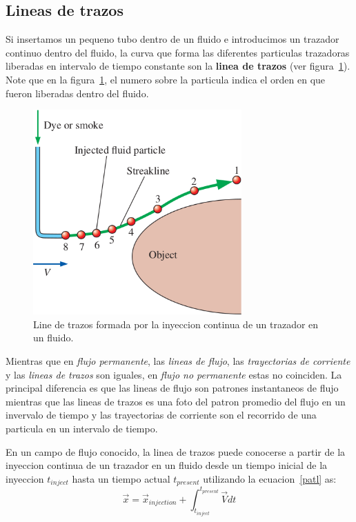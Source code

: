 \documentclass[10pt, oneside]{article}
\begin{document}
\subsection{Lineas de trazos}
Si insertamos un pequeno tubo dentro de un fluido e introducimos un  trazador continuo dentro del fluido, la curva que forma las diferentes particulas trazadoras liberadas en intervalo de tiempo constante son la \textbf{linea de trazos} (ver figura~\ref{litra}). Note que en la figura~\ref{litra}, el numero sobre la particula indica el orden en que fueron liberadas dentro del fluido. 
\begin{figure}[h]
\centering
\includegraphics[width=8cm]{litra}
\caption{Line de trazos formada por la inyeccion continua de un trazador en un fluido.}
\label{litra}
\end{figure}
Mientras que en \emph{flujo permanente}, las \emph{lineas de flujo}, las \emph{trayectorias de corriente} y las \emph{lineas de trazos} son iguales, en \emph{flujo no permanente} estas no coinciden. La principal diferencia es que las lineas de flujo son patrones instantaneos de flujo mientras que las lineas de trazos es una foto del patron promedio del flujo en un invervalo de tiempo y las trayectorias de corriente son el recorrido de una particula en un intervalo de tiempo. 


En un campo de flujo conocido, la linea de trazos puede conocerse a partir de la inyeccion continua de un trazador en un fluido desde un tiempo inicial de la inyeccion $t_{inject}$ hasta un tiempo actual $t_{present}$ utilizando la ecuacion~\ref{patl} as:
\begin{equation}
\vec{x} = \vec{x}_{injection} + \int_{t_{inject}}^{t_{present}} \vec{V} dt
\label{trazl}
\end{equation}
\end{document}
